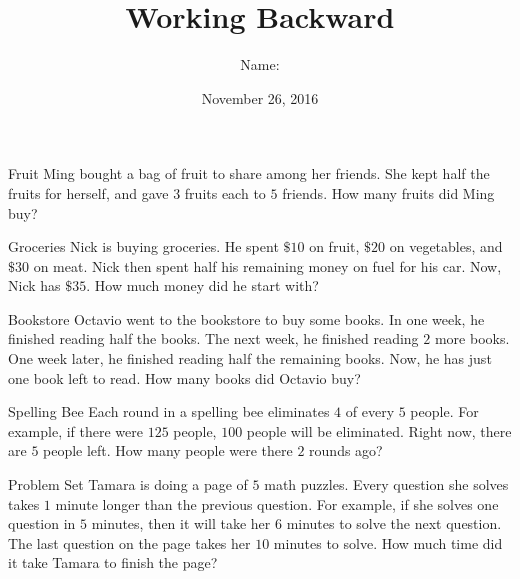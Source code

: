 \documentclass[14pt,letterpaper]{article}
\title{Working Backward}
\author{Name: \underline{\hspace{5cm}}}
\date{November 26, 2016}
\begin{document}
\HomeworkTitle

\thispagestyle{empty}

\begin{problem}{Fruit}
 Ming bought a bag of fruit to share among her friends. She kept half the
 fruits for herself, and gave $3$ fruits each to $5$ friends. How many fruits
 did Ming buy?
\end{problem}

\begin{problem}{Groceries}
 Nick is buying groceries. He spent $\$10$ on fruit, $\$20$ on vegetables, and
 $\$30$ on meat. Nick then spent half his remaining money on fuel for his car.
 Now, Nick has $\$35$. How much money did he start with?
\end{problem}

\begin{problem}{Bookstore}
 Octavio went to the bookstore to buy some books. In one week, he finished
 reading half the books. The next week, he finished reading $2$ more books. One
 week later, he finished reading half the remaining books. Now, he has just one
 book left to read. How many books did Octavio buy?
\end{problem}

\begin{problem}{Spelling Bee}
 Each round in a spelling bee eliminates $4$ of every $5$ people. For example,
 if there were $125$ people, $100$ people will be eliminated. Right now, there
 are $5$ people left. How many people were there $2$ rounds ago?
\end{problem}

\begin{problem}{Problem Set}
 Tamara is doing a page of $5$ math puzzles. Every question she solves takes
 $1$ minute longer than the previous question. For example, if she solves one
 question in $5$ minutes, then it will take her $6$ minutes to solve the next
 question. The last question on the page takes her $10$ minutes to solve. How
 much time did it take Tamara to finish the page?
\end{problem}
\end{document}

